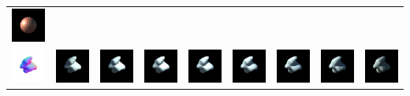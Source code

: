 \begin{center}
\begin{longtable}{@{}c@{}c@{}c@{}c@{}c@{}c@{}c@{}c@{}c@{}}
\includegraphics[width=0.1\linewidth]{training/0_7.png} \\
\includegraphics[width=0.1\linewidth]{training/1_gt.png} & \includegraphics[width=0.1\linewidth]{training/1_0.png} &
\includegraphics[width=0.1\linewidth]{training/1_1.png} & \includegraphics[width=0.1\linewidth]{training/1_2.png} &
\includegraphics[width=0.1\linewidth]{training/1_3.png} & \includegraphics[width=0.1\linewidth]{training/1_4.png} &
\includegraphics[width=0.1\linewidth]{training/1_5.png} & \includegraphics[width=0.1\linewidth]{training/1_6.png} &
\includegraphics[width=0.1\linewidth]{training/1_7.png} \\

\end{longtable}
\end{center}
